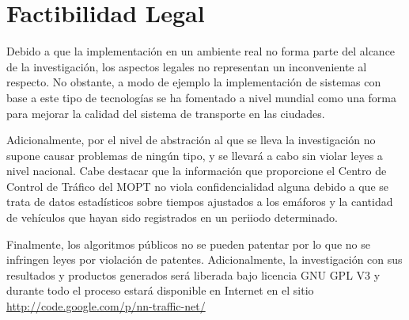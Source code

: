 	\section{Factibilidad Legal}
	
		Debido a que la implementaci\'{o}n en un ambiente real no forma parte del
		alcance de la investigaci\'{o}n, los aspectos legales no representan un inconveniente al
respecto. No obstante, a modo de ejemplo la implementaci\'{o}n de sistemas con
base a este tipo de tecnolog\'{i}as se ha fomentado a nivel mundial como una
forma para mejorar la calidad del sistema de transporte en las ciudades.
	
	Adicionalmente, por el nivel de abstraci\'{o}n al que se lleva la
investigaci\'{o}n no supone causar problemas de ning\'{u}n tipo, y se
llevar\'{a} a cabo sin violar leyes a nivel nacional. Cabe destacar que la
informaci\'{o}n que proporcione el Centro de Control de Tr\'{a}fico del MOPT no viola confidencialidad alguna
debido a que se trata de datos estad\'{i}sticos sobre tiempos ajustados a los
em\'{a}foros y la cantidad de veh\'{i}culos que hayan sido registrados en un
periiodo determinado.
	
	Finalmente, los algoritmos p\'{u}blicos no se pueden patentar por lo que no se
	infringen leyes por violaci\'{o}n de patentes. Adicionalmente, la
	investigaci\'{o}n con sus resultados y productos generados ser\'{a} liberada bajo licencia GNU GPL V3 y durante todo el proceso estar\'{a} disponible en Internet en el sitio
\url{http://code.google.com/p/nn-traffic-net/}
